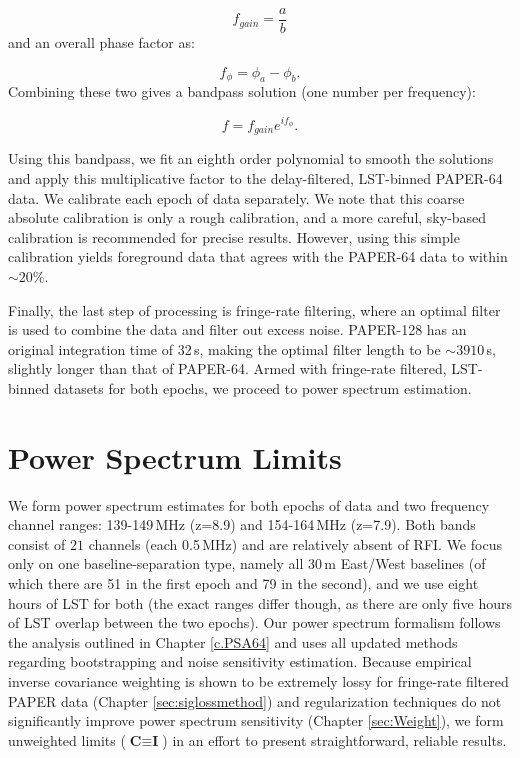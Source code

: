 \begin{equation}
f_{gain} = \frac{a}{b}
\end{equation}
and an overall phase factor as:

\begin{equation}
f_{\phi} = \phi_{a} - \phi_{b}.
\end{equation}
Combining these two gives a bandpass solution (one number per frequency):

\begin{equation}
f = f_{gain}e^{if_{\phi}}.
\end{equation}

Using this bandpass, we fit an eighth order polynomial to smooth the solutions and apply this multiplicative factor to the delay-filtered, LST-binned PAPER-64 data. We calibrate each epoch of data separately. We note that this coarse absolute calibration is only a rough calibration, and a more careful, sky-based calibration is recommended for precise results. However, using this simple calibration yields foreground data that agrees with the PAPER-64 data to within $\sim20\%$.

Finally, the last step of processing is fringe-rate filtering, where an optimal filter is used to combine the data and filter out excess noise. PAPER-128 has an original integration time of 32\,s, making the optimal filter length to be $\sim3910$\,s, slightly longer than that of PAPER-64. Armed with fringe-rate filtered, LST-binned datasets for both epochs, we proceed to power spectrum estimation.

\section{Power Spectrum Limits}

We form power spectrum estimates for both epochs of data and two frequency channel ranges: 139-149\,MHz (z=8.9) and 154-164\,MHz (z=7.9). Both bands consist of $21$ channels (each 0.5\,MHz) and are relatively absent of RFI. We focus only on one baseline-separation type, namely all 30\,m East/West baselines (of which there are 51 in the first epoch and 79 in the second), and we use eight hours of LST for both (the exact ranges differ though, as there are only five hours of LST overlap between the two epochs). Our power spectrum formalism follows the analysis outlined in Chapter \ref{c.PSA64} and uses all updated methods regarding bootstrapping and noise sensitivity estimation. Because empirical inverse covariance weighting is shown to be extremely lossy for fringe-rate filtered PAPER data (Chapter \ref{sec:siglossmethod}) and regularization techniques do not significantly improve power spectrum sensitivity (Chapter \ref{sec:Weight}), we form unweighted limits ($\textbf{C} \equiv \textbf{I}$) in an effort to present straightforward, reliable results.

